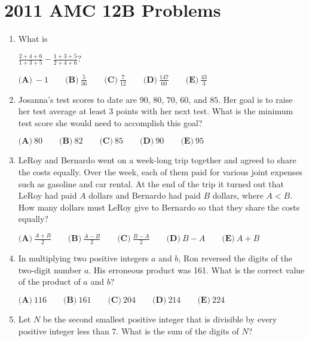 \documentclass{article}
\begin{document}
\newpage\section*{2011 AMC 12B Problems}

\begin{enumerate}[label=\arabic*., itemsep=0.5em]
\item What is \begin{center}
\( \frac{2+4+6}{1+3+5}-\frac{1+3+5}{2+4+6}? \)
\end{center}



\(\textbf{(A)}\ -1 \qquad \textbf{(B)}\ \frac{5}{36} \qquad \textbf{(C)}\ \frac{7}{12} \qquad \textbf{(D)}\ \frac{147}{60} \qquad \textbf{(E)}\ \frac{43}{3}\)\par \vspace{0.5em}\item Josanna's test scores to date are \(90\), \(80\), \(70\), \(60\), and \(85\).  Her goal is to raise her test average at least \(3\) points with her next test.  What is the minimum test score she would need to accomplish this goal?

\(\textbf{(A)}\ 80 \qquad \textbf{(B)}\ 82 \qquad \textbf{(C)}\ 85 \qquad \textbf{(D)}\ 90 \qquad \textbf{(E)}\ 95\)\par \vspace{0.5em}\item LeRoy and Bernardo went on a week-long trip together and agreed to share the costs equally.  Over the week, each of them paid for various joint expenses such as gasoline and car rental.  At the end of the trip it turned out that LeRoy had paid \(A\) dollars and Bernardo had paid \(B\) dollars, where \(A<B\).  How many dollars must LeRoy give to Bernardo so that they share the costs equally?

\(\textbf{(A)}\ \frac{A+B}{2} \qquad \textbf{(B)}\ \frac{A-B}{2} \qquad \textbf{(C)}\ \frac{B-A}{2} \qquad \textbf{(D)}\ B-A \qquad \textbf{(E)}\ A+B\)\par \vspace{0.5em}\item In multiplying two positive integers \(a\) and \(b\), Ron reversed the digits of the two-digit number \(a\).  His erroneous product was 161.  What is the correct value of the product of \(a\) and \(b\)?

\(\textbf{(A)}\ 116 \qquad \textbf{(B)}\ 161 \qquad \textbf{(C)}\ 204 \qquad \textbf{(D)}\ 214 \qquad \textbf{(E)}\ 224\)\par \vspace{0.5em}\item Let \(N\) be the second smallest positive integer that is divisible by every positive integer less than \(7\).  What is the sum of the digits of \(N\)?


\end{enumerate}
\end{document}
